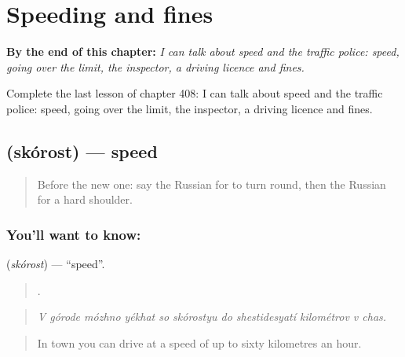 
\chapter{Speeding and fines}
\label{ch:ru-speeding-and-fines}

\begin{chapteropening}
\textbf{By the end of this chapter:} \emph{I can talk about speed and the traffic police: speed, going over the limit, the inspector, a driving licence and fines.}

Complete the last lesson of chapter 408: I can talk about speed and the traffic police: speed, going over the limit, the inspector, a driving licence and fines.
\end{chapteropening}

\section[\texorpdfstring{\ru{скорость} (skórost)}{скорость (skórost)}]{ (skórost) — speed}

\label{lesson:RU-C408-skorost}



\begin{quote}
Before the new one: say the Russian for to turn round, then the Russian for a hard shoulder.
\end{quote}

\subsection*{You'll want to know: }
\textbf{} (\emph{skórost}) — \textquotedblleft{}speed\textquotedblright{}.

\begin{quote}
          .
\end{quote}

\begin{quote}
\emph{V górode mózhno yékhat so skórostyu do shestidesyatí kilométrov v chas.}
\end{quote}

\begin{quote}
In town you can drive at a speed of up to sixty kilometres an hour.
\end{quote}

